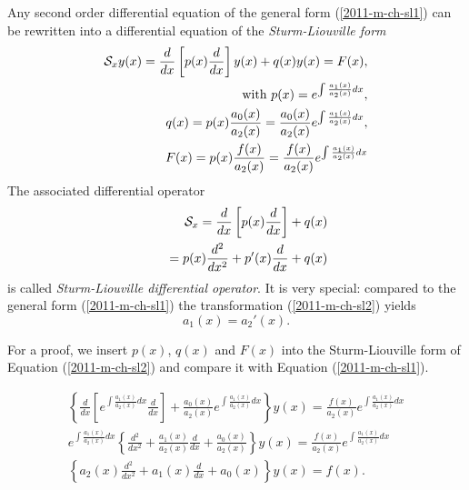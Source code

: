 Any second order differential equation of the general form (\ref{2011-m-ch-sl1})
can be rewritten into a differential equation of the {\em Sturm-Liouville form}
\begin{equation}
\begin{split}
{\cal S}_{x} y(x) =
\frac{d}{dx}
\left[
p(x)
\frac{d}{dx}
\right]  y(x)
+
q(x) y(x)
=
F(x), \\ \qquad
\textrm{with }  p(x)=e^{\int \frac{a_1(x)}{a_2(x)} dx},\\  \qquad
q(x)=p(x) \frac{a_0(x)}{a_2(x)}=  \frac{a_0(x)}{a_2(x)}e^{\int \frac{a_1(x)}{a_2(x)} dx},\\   \qquad
F(x)=p(x) \frac{f(x)}{a_2(x)}= \frac{f(x)}{a_2(x)} e^{\int \frac{a_1(x)}{a_2(x)} dx}
\end{split}
\label{2011-m-ch-sl2}
\end{equation}
The associated differential operator
\begin{equation}
\begin{split}
{\cal S}_{x}  =
\frac{d}{dx}
\left[
p(x)
\frac{d}{dx}
\right]
+
q(x)     \\
\qquad =
p(x)\frac{d^2}{dx^2}
+
p'(x)
\frac{d}{dx}
+
q(x)
\end{split}
\label{2011-m-ch-sl3}
\end{equation}
is called
{\em Sturm-Liouville differential operator}.
It is very special: compared to the general form
(\ref{2011-m-ch-sl1}) the transformation (\ref{2011-m-ch-sl2})
yields
\begin{equation}
a_1(x) = a_2'(x)
.
\label{2018-mm-ch-sl3b}
\end{equation}


{\color{OliveGreen}
\bproof
For a proof, we insert $p(x)$, $q(x)$ and $F(x)$
into the Sturm-Liouville form of Equation (\ref{2011-m-ch-sl2}) and compare it with
Equation (\ref{2011-m-ch-sl1}).

\begin{equation}
\begin{split}
\left\{  \frac{d}{dx}
\left[
e^{\int \frac{a_1(x)}{a_2(x)} dx}
\frac{d}{dx}
\right]
+
\frac{a_0(x)}{a_2(x)}e^{\int \frac{a_1(x)}{a_2(x)} dx} \right\} y(x)
=
\frac{f(x)}{a_2(x)}e^{\int \frac{a_1(x)}{a_2(x)} dx}\\
e^{\int \frac{a_1(x)}{a_2(x)} dx} \left\{
\frac{d^2}{dx^2} +
\frac{a_1(x)}{a_2(x)}
\frac{d}{dx}
+
\frac{a_0(x)}{a_2(x)}\right\} y(x)
=
\frac{f(x)}{a_2(x)}e^{\int \frac{a_1(x)}{a_2(x)} dx}\\
\left\{
a_2(x)\frac{d^2}{dx^2} +
a_1(x)\frac{d}{dx}
+
a_0(x)\right\} y(x)
=
f(x).
\end{split}
\label{2011-m-ch-sl21}
\end{equation}

\eproof
}


